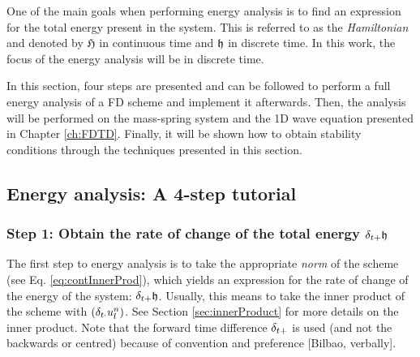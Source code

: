 {{One of the main goals when performing energy analysis is to find an expression for the total energy present in the system. This is referred to as the \textit{Hamiltonian} and denoted by $\mathfrak{H}$ in continuous time and $\mathfrak{h}$ in discrete time. In this work, the focus of the energy analysis will be in discrete time. %

In this section, four steps are presented and can be followed to perform a full energy analysis of a FD scheme and implement it afterwards. Then, the analysis will be performed on the mass-spring system and the 1D wave equation presented in Chapter \ref{ch:FDTD}. Finally, it will be shown how to obtain stability conditions through the techniques presented in this section. 

\subsection{Energy analysis: A 4-step tutorial}



\subsubsection{Step 1: Obtain the rate of change of the total energy $\delta_{t+} \mathfrak{h}$}
The first step to energy analysis is to take the appropriate \textit{norm} of the scheme (see Eq. \eqref{eq:contInnerProd}), which yields an expression for the rate of change of the energy of the system: $\delta_{t+}\mathfrak{h}$. Usually, this means to take the inner product of the scheme with $(\delta_{t\cdot} u_l^n)$. See Section \ref{sec:innerProduct} for more details on the inner product. Note that the forward time difference $\delta_{t+}$ is used (and not the backwards or centred) because of convention and preference [Bilbao, verbally].

}}
